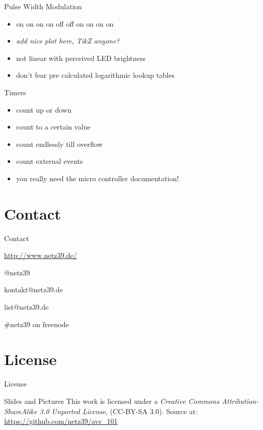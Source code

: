 \documentclass{beamer}
\begin{document}
\begin{frame}{Pulse Width Modulation}
    \begin{itemize}
        \item on on on on off off on on on on
        \pause
        \item \emph{add nice plot here, TikZ anyone?}
        \pause
        \item not linear with perceived LED brightness
        \item don't fear pre calculated logarithmic lookup tables
    \end{itemize}
\end{frame}

\begin{frame}{Timers}
    \begin{itemize}
        \item count up or down
        \item count to a certain value
        \item count endlessly till overflow
        \item count external events
        \pause
        \item you really need the micro controller documentation!
    \end{itemize}
\end{frame}

\section{Contact}

\begin{frame}{Contact}
    \begin{center}
        \begin{description}
            \item[WWW] \url{http://www.netz39.de/}
            \item[Twitter/identi.ca] @netz39
            \item[E-Mail] kontakt@netz39.de
            \item[Mailingliste] list@netz39.de
            \item[IRC] \#netz39 on freenode
        \end{description}
    \end{center}
\end{frame}

\appendix

\section{License}

\begin{frame}{License}
    \begin{block}{Slides and Pictures}
        This work is licensed under a \emph{Creative Commons
        Attribution-ShareAlike 3.0 Unported License}, (CC-BY-SA 3.0).
        Source at: \url{https://github.com/netz39/avr_101}
    \end{block}
\end{frame}
\end{document}

